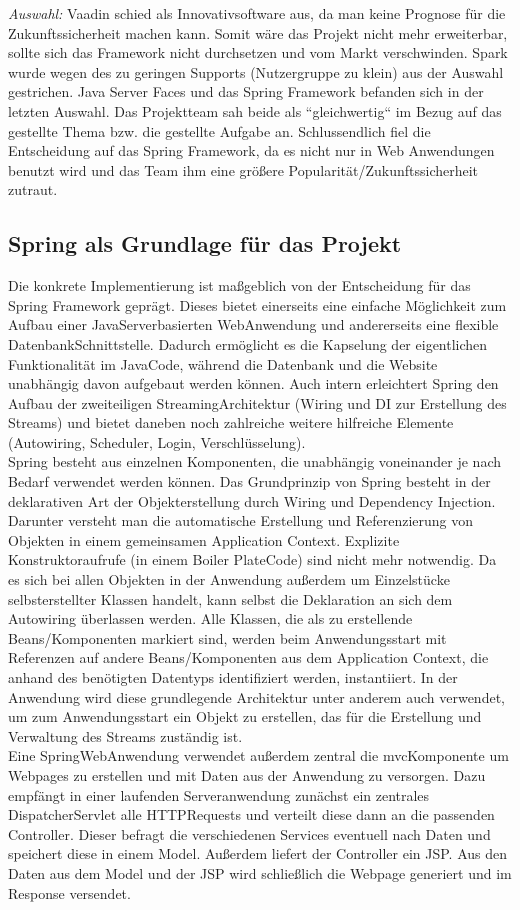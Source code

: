 \textit{Auswahl:} Vaadin schied als Innovativsoftware aus, da man keine Prognose für die Zukunftssicherheit machen kann. Somit wäre das Projekt nicht mehr erweiterbar, sollte sich das Framework nicht durchsetzen und vom Markt verschwinden. Spark wurde wegen des zu geringen Supports (Nutzergruppe zu klein) aus der Auswahl gestrichen. Java Server Faces und das Spring Framework befanden sich in der letzten Auswahl. Das Projektteam sah beide als “gleichwertig“ im Bezug auf das gestellte Thema bzw. die gestellte Aufgabe an. Schlussendlich fiel die Entscheidung auf das Spring Framework, da es nicht nur in Web Anwendungen benutzt wird und das Team ihm eine größere Popularität/Zukunftssicherheit zutraut.

\subsection{Spring als Grundlage für das Projekt}

Die konkrete Implementierung ist maßgeblich von der Entscheidung für das Spring Framework
geprägt. Dieses bietet einerseits eine einfache Möglichkeit zum Aufbau einer Java­Server­basierten
Web­Anwendung und andererseits eine flexible Datenbank­Schnittstelle. Dadurch ermöglicht es
die Kapselung der eigentlichen Funktionalität im Java­Code, während die Datenbank und die
Website unabhängig davon aufgebaut werden können. Auch intern erleichtert Spring den
Aufbau der zweiteiligen Streaming­Architektur (Wiring und DI zur Erstellung des Streams) und
bietet daneben noch zahlreiche weitere hilfreiche Elemente (Autowiring, Scheduler, Login,
Verschlüsselung). \\
Spring besteht aus einzelnen Komponenten, die unabhängig voneinander je nach
Bedarf verwendet werden können.
Das Grundprinzip von Spring besteht in der deklarativen Art der Objekterstellung durch
Wiring und Dependency Injection. Darunter versteht man die automatische Erstellung und
Referenzierung von Objekten in einem gemeinsamen Application Context. Explizite
Konstruktoraufrufe (in einem Boiler Plate­Code) sind nicht mehr notwendig. Da es sich bei allen
Objekten in der Anwendung außerdem um Einzelstücke selbsterstellter Klassen handelt, kann
selbst die Deklaration an sich dem Autowiring überlassen werden. Alle Klassen, die als zu
erstellende Beans/Komponenten markiert sind, werden beim Anwendungsstart mit Referenzen
auf andere Beans/Komponenten aus dem Application Context, die anhand des benötigten
Datentyps identifiziert werden, instantiiert.
In der Anwendung wird diese grundlegende Architektur unter anderem auch verwendet, um zum
Anwendungsstart ein Objekt zu erstellen, das für die Erstellung und Verwaltung des Streams
zuständig ist. \\
Eine Spring­Web­Anwendung verwendet außerdem zentral die mvc­Komponente um Webpages zu
erstellen und mit Daten aus der Anwendung zu versorgen. Dazu empfängt in einer laufenden
Serveranwendung zunächst ein zentrales DispatcherServlet alle HTTP­Requests und verteilt diese
dann an die passenden Controller. Dieser befragt die verschiedenen Services eventuell nach
Daten und speichert diese in einem Model. Außerdem liefert der Controller ein JSP. Aus den
Daten aus dem Model und der JSP wird schließlich die Webpage generiert und im Response
versendet.